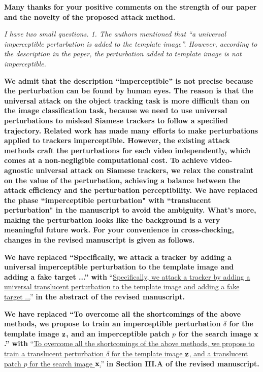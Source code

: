 \documentclass[12pt]{article}
\begin{document}
\textbf{Many thanks for your positive comments on the strength of our paper and the novelty of the proposed attack method.}

\textit{I have two small questions. 1. The authors mentioned that ``a universal imperceptible perturbation is added to the template image''. However, according to the description in the paper, the perturbation added to template image is not imperceptible.}

\textbf{
We admit that the description ``imperceptible'' is not precise because the perturbation can be found by human eyes. The reason is that the universal attack on the object tracking task is more difficult than on the image classification task, because we need to use universal perturbations to mislead Siamese trackers to follow a specified trajectory.
Related work \cite{SPARK, CSA} has made many efforts to make perturbations applied to trackers imperceptible. However, the existing attack methods craft the perturbations for each video independently, which comes at a non-negligible computational cost. To achieve video-agnostic universal attack on Siamese trackers, we relax the constraint on the value of the perturbation, achieving a balance between the attack efficiency and the perturbation perceptibility.
We have replaced the phase ``imperceptible perturbation" with ``translucent perturbation" \cite{zolfi2021translucent} in the manuscript to avoid the ambiguity.
What's more, making the perturbation looks like the background is a very meaningful future work.
For your convenience in cross-checking, changes in the revised manuscript is given as follows.}

\textbf{We have replaced ``Specifically, we attack a tracker by adding a universal imperceptible perturbation to the template image and adding a fake target ...'' with}
 ``\uline{Specifically, we attack a tracker by adding a universal translucent perturbation to the template image and adding a fake target ...}''
\textbf{in the abstract of the revised manuscript.}

\textbf{We have replaced ``To overcome all the shortcomings of the above methods, we propose to train an imperceptible perturbation $\delta$ for the template image $\textbf z$, and an imperceptible patch $p$ for the search image $\textbf x$.'' with} 
``\uline{To overcome all the shortcomings of the above methods, we propose to train a translucent perturbation $\delta$ for the template image $\textbf z$, and a translucent patch $p$ for the search image $\textbf x$.}'' 
\textbf{in Section III.A of the revised manuscript.}
\end{document}
